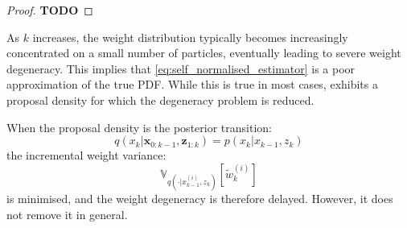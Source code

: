\begin{proof}
	\textbf{TODO}
\end{proof}

As $k$ increases, the weight distribution typically becomes increasingly concentrated on a small number of particles, eventually leading to severe weight degeneracy. This implies that \eqref{eq:self_normalised_estimator} is a poor approximation of the true PDF. While this is true in most cases,  exhibits a proposal density for which the degeneracy problem is reduced.

\begin{proposition}\label{th:optimal_proposal}
	When the proposal density is the posterior transition:
	\begin{equation}
		q(x_k|\mathbf{x}_{0:k-1},\mathbf{z}_{1:k})=p(x_k|x_{k-1},z_k)\label{eq:optimal_proposal}
	\end{equation}
	the incremental weight variance:
	\begin{equation}
		\mathbb{V}_{q\left(\cdot|x_{k-1}^{(i)},z_k\right)}\left[\tilde{w}_k^{(i)}\right]
	\end{equation}
	is minimised, and the weight degeneracy is therefore delayed. However, it does not remove it in general.
\end{proposition}

